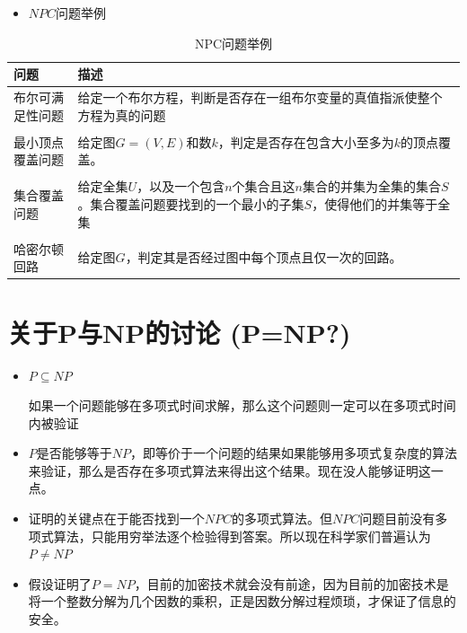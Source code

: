 \begin{itemize}
	\item $NPC$问题举例
\end{itemize}	

	\begin{table}[!htbp]
		\centering
		\caption{NPC问题举例}
		\begin{tabular}{p{100pt}p{200pt}}
			\toprule[0.5mm]
			问题 & 描述\\
			\midrule[0.4mm]
			布尔可满足性问题&给定一个布尔方程，判断是否存在一组布尔变量的真值指派使整个方程为真的问题\\ \\
			最小顶点覆盖问题&给定图$G=(V,E)$和数$k$，判定是否存在包含大小至多为$k$的顶点覆盖。\\ \\
			集合覆盖问题&给定全集$U$，以及一个包含$n$个集合且这$n$集合的并集为全集的集合$S$。集合覆盖问题要找到的一个最小的子集$S$，使得他们的并集等于全集\\ \\
			哈密尔顿回路&给定图$G$，判定其是否经过图中每个顶点且仅一次的回路。\\
			\bottomrule
		\end{tabular}
	\end{table}
\section{关于P与NP的讨论 (P=NP?)}

\begin{itemize}
	\item $P\subseteq NP$
	
如果一个问题能够在多项式时间求解，那么这个问题则一定可以在多项式时间内被验证
\end{itemize}
\begin{itemize}
	\item $P$是否能够等于$NP$，即等价于一个问题的结果如果能够用多项式复杂度的算法来验证，那么是否存在多项式算法来得出这个结果。现在没人能够证明这一点。
\end{itemize}
\begin{itemize}
	\item 证明的关键点在于能否找到一个$NPC$的多项式算法。但$NPC$问题目前没有多项式算法，只能用穷举法逐个检验得到答案。所以现在科学家们普遍认为$P\neq NP$
\end{itemize}
\begin{itemize}
	\item 假设证明了$P= NP$，目前的加密技术就会没有前途，因为目前的加密技术是将一个整数分解为几个因数的乘积，正是因数分解过程烦琐，才保证了信息的安全。
\end{itemize}
	
